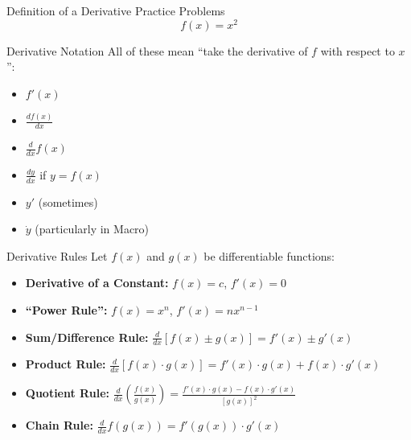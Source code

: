 \documentclass[aspectratio=169]{beamer}
\begin{document}
\begin{frame}{Definition of a Derivative Practice Problems}\label{main1}
	\vspace{-4cm}
    \[
    f(x) = x^{2}
    \]
\end{frame}

\begin{frame}{Derivative Notation}\label{main1}
All of these mean “take the derivative of \(f\) with respect to \(x\)”:
\begin{itemize}
\begin{itemize}
    \item \(f'(x)\)
    \item \(\frac{df(x)}{dx}\)
    \item \(\frac{d}{dx} f(x)\)
    \item \(\frac{dy}{dx}\) if \(y = f(x)\)
    \item \(y'\) (sometimes)
    \item \( \dot{y} \) (particularly in Macro)
\end{itemize}
\end{itemize}
\end{frame}

\begin{frame}{Derivative Rules}\label{main1}
Let \(f(x)\) and \(g(x)\) be differentiable functions:
\begin{itemize}
    \item \textbf{Derivative of a Constant:} \(f(x) = c\), \(f'(x) = 0\)
    \item \textbf{“Power Rule”:} \(f(x) = x^n\), \(f'(x) = nx^{n-1}\) 
    \item \textbf{Sum/Difference Rule:} \quad $\frac{d}{dx} [f(x) \pm g(x)] = f'(x) \pm g'(x)$
    \item \textbf{Product Rule:} \quad $\frac{d}{dx} [f(x) \cdot g(x)] = f'(x) \cdot g(x) + f(x) \cdot g'(x)$
    \item \textbf{Quotient Rule:} \quad $\frac{d}{dx} \left( \frac{f(x)}{g(x)} \right) = \frac{f'(x) \cdot g(x) - f(x) \cdot g'(x)}{[g(x)]^2}$
    \item \textbf{Chain Rule:} \quad $\frac{d}{dx} f(g(x)) = f'(g(x)) \cdot g'(x)$
\end{itemize}
\end{frame}
\end{document}
